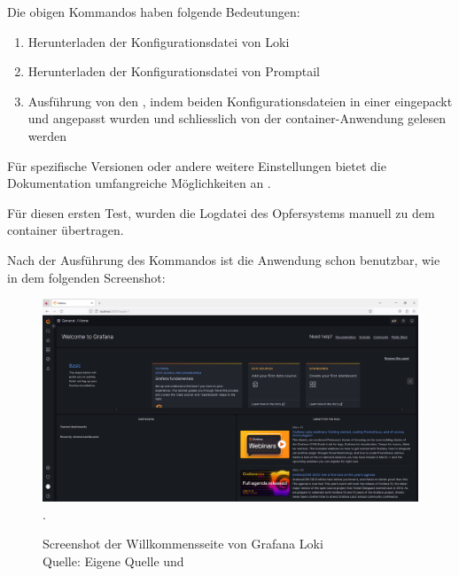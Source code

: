 Die obigen Kommandos haben folgende Bedeutungen:
\begin{enumerate}[noitemsep]
   \item Herunterladen der Konfigurationsdatei von Loki
   \item Herunterladen der Konfigurationsdatei von Promptail
   \item Ausführung von den , indem beiden Konfigurationsdateien in einer eingepackt und angepasst wurden und schliesslich von der \gls{container}-Anwendung gelesen werden
\end{enumerate}

Für spezifische Versionen oder andere weitere Einstellungen bietet die Dokumentation umfangreiche Möglichkeiten an \citep{GrafanaLoki_run}.

Für diesen ersten Test, wurden die Logdatei des Opfersystems manuell zu dem \gls{container} übertragen.

\newpage
\thispagestyle{lscape}
\begin{landscape}
   Nach der Ausführung des Kommandos ist die Anwendung schon benutzbar, wie in dem folgenden Screenshot:
   \begin{center}
      \begin{figure}[H]
         \centering
         \includegraphics[width=1.3\textwidth]{assets/Installation_Grafana.png}.
         \caption{Screenshot der Willkommensseite von Grafana Loki\\Quelle: Eigene Quelle und \citep{Grafana_Logs}}
         \centering
      \end{figure}
   \end{center}
\end{landscape}

